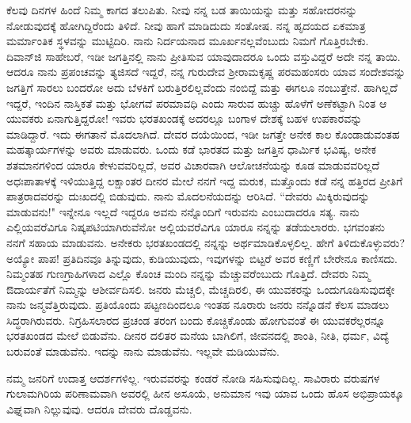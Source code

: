 ಕೆಲವು ದಿನಗಳ ಹಿಂದೆ ನಿಮ್ಮ ಕಾಗದ ತಲುಪಿತು. ನೀವು ನನ್ನ ಬಡ ತಾಯಿಯನ್ನು ಮತ್ತು ಸಹೋದರನನ್ನು ನೋಡುವುದಕ್ಕೆ ಹೋಗಿದ್ದಿರೆಂದು ತಿಳಿದೆ. ನೀವು ಹಾಗೆ ಮಾಡಿದುದು ಸಂತೋಷ. ನನ್ನ ಹೃದಯದ ಏಕಮಾತ್ರ ಮರ್ಮಾಂತಿಕ ಸ್ಥಳವನ್ನು ಮುಟ್ಟಿದಿರಿ. ನಾನು ನಿರ್ದಯನಾದ ಮೂರ್ಖನಲ್ಲವೆಂಬುದು ನಿಮಗೆ ಗೊತ್ತಿರಬೇಕು. ದಿವಾನ್‌ಜಿ ಸಾಹೇಬರೆ, ಇಡೀ ಜಗತ್ತಿನಲ್ಲಿ ನಾನು ಪ್ರೀತಿಸುವ ಯಾವುದಾದರೂ ಒಂದು ವಸ್ತುವಿದ್ದರೆ ಅದೇ ನನ್ನ ತಾಯಿ. ಆದರೂ ನಾನು ಪ್ರಪಂಚವನ್ನು ತ್ಯಜಿಸದೆ ಇದ್ದರೆ, ನನ್ನ ಗುರುದೇವ ಶ‍್ರೀರಾಮಕೃಷ್ಣ ಪರಮಹಂಸರು ಯಾವ ಸಂದೇಶವನ್ನು ಜಗತ್ತಿಗೆ ಸಾರಲು ಬಂದರೋ ಅದು ಬೆಳಕಿಗೆ ಬರುತ್ತಿರಲಿಲ್ಲವೆಂದು ನಂಬಿದ್ದೆ ಮತ್ತು ಈಗಲೂ ನಂಬುತ್ತೇನೆ. ಹಾಗಿಲ್ಲದೆ ಇದ್ದರೆ, ಇಂದಿನ ನಾಸ್ತಿಕತೆ ಮತ್ತು ಭೋಗವೆ ಪರಮಾವಧಿ ಎಂದು ಸಾರುವ ಹುಚ್ಚು ಹೊಳೆಗೆ ಅಣೆಕಟ್ಟಾಗಿ ನಿಂತ ಆ ಯುವಕರು ಏನಾಗುತ್ತಿದ್ದರೋ! ಇವರು ಭರತಖಂಡಕ್ಕೆ ಅದರಲ್ಲೂ ಬಂಗಾಳ ದೇಶಕ್ಕೆ ಬಹಳ ಉಪಕಾರವನ್ನು ಮಾಡಿದ್ದಾರೆ. ಇದು ಈಗತಾನೆ ಮೊದಲಾಗಿದೆ. ದೇವರ ದಯೆಯಿಂದ, ಇಡೀ ಜಗತ್ತೇ ಅನೇಕ ಕಾಲ ಕೊಂಡಾಡುವಂತಹ ಮಹತ್ಕಾರ್ಯಗಳನ್ನು ಅವರು ಮಾಡುವರು. ಒಂದು ಕಡೆ ಭಾರತದ ಮತ್ತು ಜಗತ್ತಿನ ಧಾರ್ಮಿಕ ಭವಿಷ್ಯ, ಅನೇಕ ಶತಮಾನಗಳಿಂದ ಯಾರೂ ಕೇಳುವವರಿಲ್ಲದೆ, ಅವರ ವಿಚಾರವಾಗಿ ಆಲೋಚನೆಯನ್ನು ಕೂಡ ಮಾಡುವವರಿಲ್ಲದೆ ಅಧಃಪಾತಾಳಕ್ಕೆ ಇಳಿಯುತ್ತಿದ್ದ ಲಕ್ಷಾಂತರ ದೀನರ ಮೇಲೆ ನನಗೆ ಇದ್ದ ಮರುಕ, ಮತ್ತೊಂದು ಕಡೆ ನನ್ನ ಹತ್ತಿರದ ಪ್ರೀತಿಗೆ ಪಾತ್ರರಾದವರನ್ನು ದುಃಖದಲ್ಲಿ ಬಿಡುವುದು. ನಾನು ಮೊದಲನೆಯದನ್ನು ಆರಿಸಿದೆ. “ದೇವರು ಮಿಕ್ಕಿರುವುದನ್ನು ಮಾಡುವನು!" ಇನ್ನೇನೂ ಇಲ್ಲದೆ ಇದ್ದರೂ ಅವನು ನನ್ನೊಂದಿಗೆ ಇರುವನು ಎಂಬುದಾದರೂ ಸತ್ಯ. ನಾನು ಎಲ್ಲಿಯವರೆವಿಗೂ ನಿಷ್ಕಪಟಿಯಾಗಿರುವೆನೋ ಅಲ್ಲಿಯವರೆವಿಗೂ ಯಾರೂ ನನ್ನನ್ನು ತಡೆಯಲಾರರು. ಭಗವಂತನು ನನಗೆ ಸಹಾಯ ಮಾಡುವನು. ಅನೇಕರು ಭರತಖಂಡದಲ್ಲಿ ನನ್ನನ್ನು ಅರ್ಥಮಾಡಿಕೊಳ್ಳಲಿಲ್ಲ. ಹೇಗೆ ತಿಳಿದುಕೊಳ್ಳುವರು? ಅಯ್ಯೋ ಪಾಪ! ಪ್ರತಿದಿನವೂ ತಿನ್ನುವುದು, ಕುಡಿಯುವುದು, ಇವುಗಳನ್ನು ಬಿಟ್ಟರೆ ಅವರ ಕಣ್ಣಿಗೆ ಬೇರೇನೂ ಕಾಣಿಸದು. ನಿಮ್ಮಂತಹ ಗುಣಗ್ರಾಹಿಗಳಾದ ಎಲ್ಲೊ ಕೊಂಚ ಮಂದಿ ನನ್ನನ್ನು ಮೆಚ್ಚುವರೆಂಬುದು ಗೊತ್ತಿದೆ. ದೇವರು ನಿಮ್ಮ ಔದಾರ್ಯತೆಗೆ ನಿಮ್ಮನ್ನು ಆಶೀರ್ವದಿಸಲಿ. ಜನರು ಮೆಚ್ಚಲಿ, ಮೆಚ್ಚದಿರಲಿ, ಈ ಯುವಕರನ್ನು ಒಂದುಗೂಡಿಸುವುದಕ್ಕೇ ನಾನು ಜನ್ಮವೆತ್ತಿರುವುದು. ಪ್ರತಿಯೊಂದು ಪಟ್ಟಣದಿಂದಲೂ ಇಂತಹ ನೂರಾರು ಜನರು ನನ್ನೊಡನೆ ಕೆಲಸ ಮಾಡಲು ಸಿದ್ಧರಾಗಿರುವರು. ನಿಗ್ರಹಿಸಲಾರದ ಪ್ರಚಂಡ ತರಂಗ ಬಂದು ಕೊಚ್ಚಿಕೊಂಡು ಹೋಗುವಂತೆ ಈ ಯುವಕರೆಲ್ಲರನ್ನೂ ಭರತಖಂಡದ ಮೇಲೆ ಬಿಡುವೆನು. ದೀನರ ದಲಿತರ ಮನೆಯ ಬಾಗಿಲಿಗೆ, ಜೀವನದಲ್ಲಿ ಶಾಂತಿ, ನೀತಿ, ಧರ್ಮ, ವಿದ್ಯೆ ಬರುವಂತೆ ಮಾಡುವೆನು. ಇದನ್ನು ನಾನು ಮಾಡುವೆನು. ಇಲ್ಲವೇ ಮಡಿಯುವೆನು.

ನಮ್ಮ ಜನರಿಗೆ ಉದಾತ್ತ ಆದರ್ಶಗಳಿಲ್ಲ. ಇರುವವರನ್ನು ಕಂಡರೆ ನೋಡಿ ಸಹಿಸುವುದಿಲ್ಲ. ಸಾವಿರಾರು ವರುಷಗಳ ಗುಲಾಮಗಿರಿಯ ಪರಿಣಾಮವಾಗಿ ಅವರಲ್ಲಿ ಹೀನ ಅಸೂಯೆ, ಅನುಮಾನ ಇವು ಯಾವ ಒಂದು ಹೊಸ ಅಭಿಪ್ರಾಯಕ್ಕೂ ವಿಘ್ನವಾಗಿ ನಿಲ್ಲುವುವು. ಆದರೂ ದೇವರು ದೊಡ್ಡವನು.

